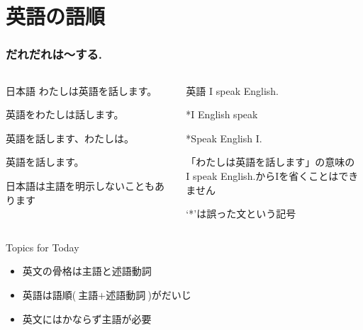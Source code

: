 \documentclass[aspectratio=169,xcolor={dvipsnames,table}]{beamer}
\begin{document}
\section{英語の語順}
\begin{frame}[plain]\frametitle{だれだれは〜する.}

\begin{columns}
\begin{column}[t]{.45\textwidth}
\begin{block}{日本語}
わたしは英語を話します。\pause

英語をわたしは話します。\pause

英語を話します、わたしは。\pause

英語を話します。

\hfill{\scriptsize 日本語は主語を明示しないこともあります}
\end{block}
\end{column}
\pause
\begin{column}[t]{.45\textwidth}
\begin{alertblock}{英語}
I speak English.\pause

\mbox{}\hspace{75pt}*I English speak\pause

\mbox{}\hspace{75pt}*Speak English I.\pause

\bigskip

{\scriptsize 「わたしは英語を話します」の意味の\\[-5pt]I speak English.からIを省くことはできません}

\scriptsize
\mbox{}\hspace{75pt}%
`*'は誤った文という記号　
\end{alertblock}
\end{column}
\end{columns}


\bigskip
\pause
\begin{exampleblock}{Topics for Today}
\begin{itemize}[circle]
 \item   英文の骨格は主語と述語動詞
 \item   英語は語順($\text{主語}+\text{述語動詞}$)がだいじ
 \item   英文にはかならず主語が必要
\end{itemize}
     \end{exampleblock}
\end{frame}
\end{document}
